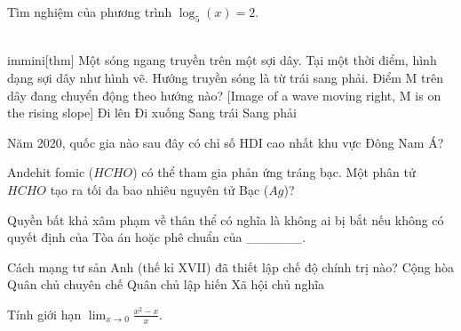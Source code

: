 \begin{ex}
    Tìm nghiệm của phương trình $\log_5(x) = 2$.
\end{ex}

\begin{ex}
    \\immini[thm]{
        Một sóng ngang truyền trên một sợi dây. Tại một thời điểm, hình dạng sợi dây như hình vẽ. Hướng truyền sóng là từ trái sang phải. Điểm M trên dây đang chuyển động theo hướng nào?
    }{
        [Image of a wave moving right, M is on the rising slope]}
    \choice
    {\True Đi lên}
    {Đi xuống}
    {Sang trái}
    {Sang phải}
\end{ex}

\begin{ex}
    Năm 2020, quốc gia nào sau đây có chỉ số HDI cao nhất khu vực Đông Nam Á?

\end{ex}

\begin{ex}
    Andehit fomic ($HCHO$) có thể tham gia phản ứng tráng bạc. Một phân tử $HCHO$ tạo ra tối đa bao nhiêu nguyên tử Bạc ($Ag$)?
\end{ex}

\begin{ex}
    Quyền bất khả xâm phạm về thân thể có nghĩa là không ai bị bắt nếu không có quyết định của Tòa án hoặc phê chuẩn của ______.

\end{ex}

\begin{ex}
    Cách mạng tư sản Anh (thế kỉ XVII) đã thiết lập chế độ chính trị nào?
    \choice
    {Cộng hòa}
    {Quân chủ chuyên chế}
    {\True Quân chủ lập hiến}
    {Xã hội chủ nghĩa}
\end{ex}

\begin{ex}
    Tính giới hạn $\lim_{x \to 0} \frac{x^2 - x}{x}$.
\end{ex}

